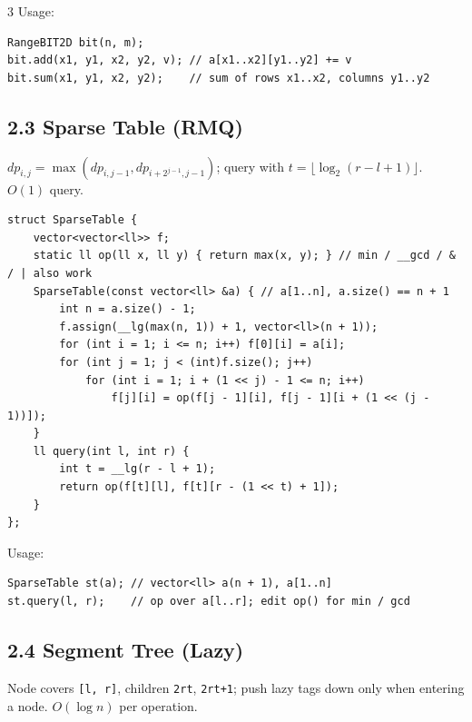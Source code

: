 \documentclass[8pt]{extarticle}
\begin{document}
\begin{multicols*}{3}
Usage:

\begin{lstlisting}
RangeBIT2D bit(n, m);
bit.add(x1, y1, x2, y2, v); // a[x1..x2][y1..y2] += v
bit.sum(x1, y1, x2, y2);    // sum of rows x1..x2, columns y1..y2
\end{lstlisting}

\subsection*{2.3 Sparse Table (RMQ)}

$dp_{i,j} = \max(dp_{i,j-1}, dp_{i+2^{j-1},j-1})$; query with $t = \lfloor \log_2(r-l+1) \rfloor$. $O(1)$ query.

\begin{lstlisting}
struct SparseTable {
    vector<vector<ll>> f;
    static ll op(ll x, ll y) { return max(x, y); } // min / __gcd / & / | also work
    SparseTable(const vector<ll> &a) { // a[1..n], a.size() == n + 1
        int n = a.size() - 1;
        f.assign(__lg(max(n, 1)) + 1, vector<ll>(n + 1));
        for (int i = 1; i <= n; i++) f[0][i] = a[i];
        for (int j = 1; j < (int)f.size(); j++)
            for (int i = 1; i + (1 << j) - 1 <= n; i++)
                f[j][i] = op(f[j - 1][i], f[j - 1][i + (1 << (j - 1))]);
    }
    ll query(int l, int r) {
        int t = __lg(r - l + 1);
        return op(f[t][l], f[t][r - (1 << t) + 1]);
    }
};
\end{lstlisting}

Usage:

\begin{lstlisting}
SparseTable st(a); // vector<ll> a(n + 1), a[1..n]
st.query(l, r);    // op over a[l..r]; edit op() for min / gcd
\end{lstlisting}

\subsection*{2.4 Segment Tree (Lazy)}

Node covers \texttt{[l, r]}, children \texttt{2rt}, \texttt{2rt+1}; push lazy tags down only when entering a node. $O(\log n)$ per operation.


\end{multicols*}
\end{document}
